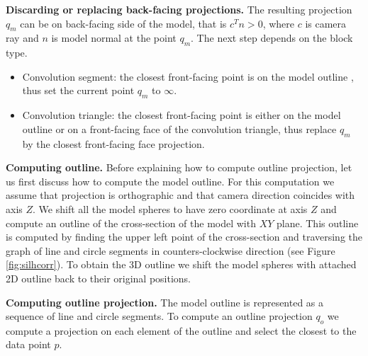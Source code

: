 \textbf{Discarding or replacing back-facing projections.}
The resulting projection $q_m$ can be on back-facing side of the model, that is $c^{T} n > 0$, where $c$ is camera ray and $n$ is model normal at the point $q_m$.
The next step depends on the block type. 
\begin{itemize}
	\item Convolution segment: the closest front-facing point is on the model outline , thus set the current point $q_m$ to $\infty$.
	\item Convolution triangle: the closest front-facing point is either on the model outline or on a front-facing face of the convolution triangle, thus replace $q_m$ by the closest front-facing face projection.
\end{itemize}

\textbf{Computing outline.}
Before explaining how to compute outline projection, let us first discuss how to compute the model outline. For this computation we assume that projection is orthographic and that camera direction coincides with axis $Z$. We shift all the model spheres to have zero coordinate at axis $Z$ and compute an outline of the cross-section of the model with $XY$ plane. This outline is computed by finding the upper left point of the cross-section and traversing the graph of line and circle segments in counters-clockwise direction (see Figure \ref{fig:silhcorr}). To obtain the 3D outline we shift the model spheres with attached 2D outline back to their original positions.



\textbf{Computing outline projection.}
The model outline is represented as a sequence of line and circle segments. To compute an outline projection $q_o$ we compute a projection on each element of the outline and select the closest to the data point $p$.